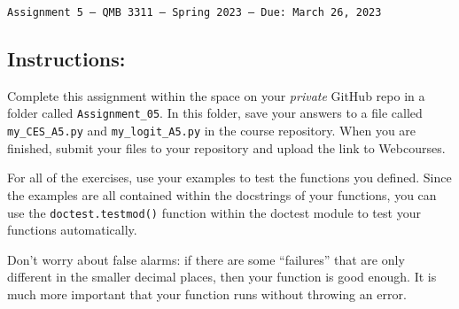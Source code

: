 \documentclass[11pt]{exam}
\begin{document}
\texttt{Assignment 5 --- QMB 3311 ---  Spring 2023  --- Due: March 26, 2023}

\subsection*{Instructions:}

Complete this assignment within the space on your \textit{private} GitHub repo in a folder called \texttt{Assignment\_05}. In this folder, save your answers to a file called \texttt{my\_CES\_A5.py} and \texttt{my\_logit\_A5.py} in the course repository. When you are finished, submit your files to your repository and upload the link to Webcourses.

For all of the exercises, use your examples to test the functions you defined. Since the examples are all contained within the docstrings of your functions, you can use the
\texttt{doctest.testmod()} function within the doctest module to test your functions automatically.

Don't worry about false alarms: if there are some ``failures'' that are only different in the smaller decimal places, then your function is good enough. It is much more important that your function runs without throwing an error.
\end{document}
